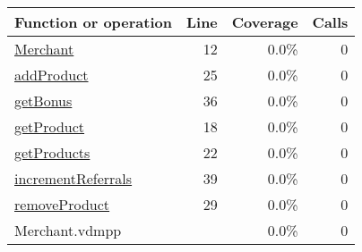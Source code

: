 \bigskip
\begin{longtable}{|l|r|r|r|}
\hline
Function or operation & Line & Coverage & Calls \\
\hline
\hline
\hyperref[Merchant:12]{Merchant} & 12&0.0\% & 0 \\
\hline
\hyperref[addProduct:25]{addProduct} & 25&0.0\% & 0 \\
\hline
\hyperref[getBonus:36]{getBonus} & 36&0.0\% & 0 \\
\hline
\hyperref[getProduct:18]{getProduct} & 18&0.0\% & 0 \\
\hline
\hyperref[getProducts:22]{getProducts} & 22&0.0\% & 0 \\
\hline
\hyperref[incrementReferrals:39]{incrementReferrals} & 39&0.0\% & 0 \\
\hline
\hyperref[removeProduct:29]{removeProduct} & 29&0.0\% & 0 \\
\hline
\hline
Merchant.vdmpp & & 0.0\% & 0 \\
\hline
\end{longtable}

